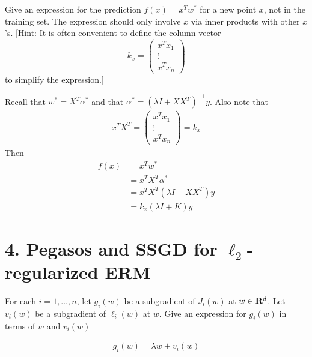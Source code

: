 \documentclass[12pt,letterpaper]{article}
\begin{document}
\begin{problem}{3.6}
     Give an expression for the prediction $f(x)=x^{T}w^{*}$ for a new
    point $x$, not in the training set. The expression should only involve
    $x$ via inner products with other $x$'s. {[}Hint: It is often convenient
    to define the column vector
    \[
    k_{x}=\begin{pmatrix}x^{T}x_{1}\\
    \vdots\\
    x^{T}x_{n}
    \end{pmatrix}
    \]
    to simplify the expression.{]}
\end{problem}
\begin{solution}{}
    Recall that $w^* = X^T\alpha^*$ and that $\alpha^* = (\lambda I + XX^T)^{-1}y$.
    Also note that
    \begin{align*}
        x^TX^T = \begin{pmatrix}x^{T}x_{1}\\
                    \vdots\\
                    x^{T}x_{n}
                    \end{pmatrix} = k_x
    \end{align*}
    Then
    \begin{align*}
        f(x) &= x^Tw^*\\
        &= x^TX^T\alpha^*\\
        &= x^TX^T(\lambda I + XX^T)y\\
        &= k_x(\lambda I + K)y
    \end{align*}
\end{solution}
\newpage

\section*{4. Pegasos and SSGD for $\ell_{2}$-regularized ERM}
\begin{problem}{4.1}
For each $i=1,\ldots,n$, let $g_{i}(w)$ be a subgradient
of $J_{i}(w)$ at $w\in\mathbf{R}^{d}$. Let $v_{i}(w)$ be a subgradient
of $\ell_{i}(w)$ at $w$. Give an expression for $g_{i}(w)$ in terms
of $w$ and $v_{i}(w)$
\end{problem}
\begin{solution}{}
    \begin{align*}
        g_i(w) = \lambda w + v_i(w)
    \end{align*}
\end{solution}
\newpage
\end{document}
